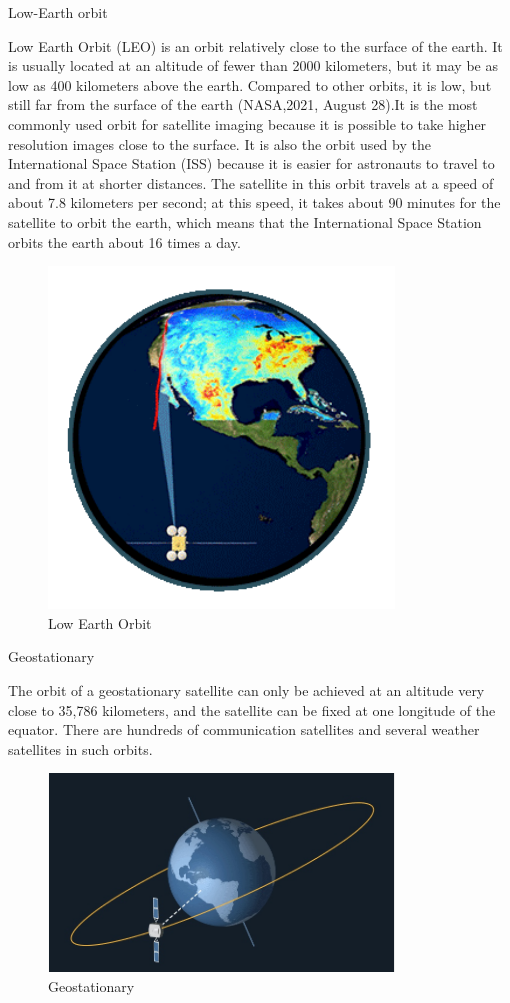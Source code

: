 \documentclass[conference]{IEEEtran}
\newcommand{\subparagraph}{}
\begin{document}
	\subparagraph{Low-Earth orbit}
	
	Low Earth Orbit (LEO) is an orbit relatively close to the surface of the earth. It is usually located at an altitude of fewer than 
	2000 kilometers, but it may be as low as 400 kilometers above the earth. Compared to other orbits, it is low, but still far from the 
	surface of the earth (NASA,2021, August 28).It is the most commonly used orbit for satellite imaging because it is possible to take 
	higher resolution images close to the surface. It is also the orbit used by the International Space Station (ISS) because it is easier 
	for astronauts to travel to and from it at shorter distances. The satellite in this orbit travels at a speed of about 7.8 kilometers per 
	second; at this speed, it takes about 90 minutes for the satellite to orbit the earth, which means that the International Space Station 
	orbits the earth about 16 times a day\cite{ESAkerne12:online}.

\begin{figure}[htbp]
    \centerline{\includegraphics[width=260pt]{images/1.1.2.png}}
    \caption{Low Earth Orbit }
    \label{LEO}
\end{figure}

	\subparagraph{Geostationary}
	
	The orbit of a geostationary satellite can only be achieved at an altitude very close to 35,786 kilometers, and the satellite can 
	be fixed at one longitude of the equator. There are hundreds of communication satellites and several weather satellites in such orbits.

\begin{figure}[htbp]
    \centerline{\includegraphics[width=260pt]{images/1.1.3.png}}
    \caption{Geostationary}
    \label{Geostationary}
\end{figure}
\end{document}
